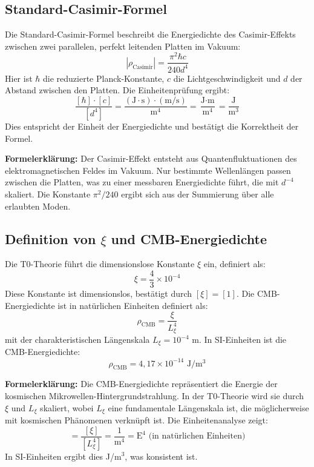 	\subsection{Standard-Casimir-Formel}
	Die Standard-Casimir-Formel beschreibt die Energiedichte des Casimir-Effekts zwischen zwei parallelen, perfekt leitenden Platten im Vakuum:
	\begin{equation}
		|\rho_{\text{Casimir}}| = \frac{\pi^2 \hbar c}{240 d^4}
	\end{equation}
	Hier ist $\hbar$ die reduzierte Planck-Konstante, $c$ die Lichtgeschwindigkeit und $d$ der Abstand zwischen den Platten. Die Einheitenprüfung ergibt:
	\begin{equation}
		\frac{[\hbar] \cdot [c]}{[d^4]} = \frac{(\text{J} \cdot \text{s}) \cdot (\text{m}/\text{s})}{\text{m}^4} = \frac{\text{J} \cdot \text{m}}{\text{m}^4} = \frac{\text{J}}{\text{m}^3}
	\end{equation}
	Dies entspricht der Einheit der Energiedichte und bestätigt die Korrektheit der Formel.
	
	\textbf{Formelerklärung:} Der Casimir-Effekt entsteht aus Quantenfluktuationen des elektromagnetischen Feldes im Vakuum. Nur bestimmte Wellenlängen passen zwischen die Platten, was zu einer messbaren Energiedichte führt, die mit $d^{-4}$ skaliert. Die Konstante $\pi^2/240$ ergibt sich aus der Summierung über alle erlaubten Moden.
	
	\subsection{Definition von $\xi$ und CMB-Energiedichte}
	Die T0-Theorie führt die dimensionslose Konstante $\xi$ ein, definiert als:
	\begin{equation}
		\xi = \frac{4}{3} \times 10^{-4}
	\end{equation}
	Diese Konstante ist dimensionslos, bestätigt durch $[\xi] = [1]$. Die CMB-Energiedichte ist in natürlichen Einheiten definiert als:
	\begin{equation}
		\rho_{\text{CMB}} = \frac{\xi}{L_\xi^4}
	\end{equation}
	mit der charakteristischen Längenskala $L_\xi = 10^{-4}$ m. In SI-Einheiten ist die CMB-Energiedichte:
	\begin{equation}
		\rho_{\text{CMB}} = 4,17 \times 10^{-14} \text{ J}/\text{m}^3
	\end{equation}
	
	\textbf{Formelerklärung:} Die CMB-Energiedichte repräsentiert die Energie der kosmischen Mikrowellen-Hintergrundstrahlung. In der T0-Theorie wird sie durch $\xi$ und $L_\xi$ skaliert, wobei $L_\xi$ eine fundamentale Längenskala ist, die möglicherweise mit kosmischen Phänomenen verknüpft ist. Die Einheitenanalyse zeigt:
	\begin{equation}
		[\rho_{\text{CMB}}] = \frac{[\xi]}{[L_\xi^4]} = \frac{1}{\text{m}^4} = \text{E}^4 \text{ (in natürlichen Einheiten)}
	\end{equation}
	In SI-Einheiten ergibt dies J/m$^3$, was konsistent ist.
	
